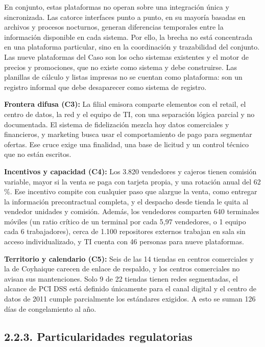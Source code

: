 \documentclass[11pt]{article}
\begin{document}
En conjunto, estas plataformas no operan sobre una integración única y sincronizada. Las catorce interfaces punto a punto, en su mayoría basadas en archivos y procesos nocturnos, generan diferencias temporales entre la información disponible en cada sistema. Por ello, la brecha no está concentrada en una plataforma particular, sino en la coordinación y trazabilidad del conjunto. Las nueve plataformas del Caso son los ocho sistemas existentes y el motor de precios y promociones, que no existe como sistema y debe construirse. Las planillas de cálculo y listas impresas no se cuentan como plataforma: son un registro informal que debe desaparecer como sistema de registro.

\textbf{Frontera difusa (C3):} La filial emisora comparte elementos con el retail, el centro de datos, la red y el equipo de TI, con una separación lógica parcial y no documentada. El sistema de fidelización mezcla hoy datos comerciales y financieros, y marketing busca usar el comportamiento de pago para segmentar ofertas. Ese cruce exige una finalidad, una base de licitud y un control técnico que no están escritos.

\textbf{Incentivos y capacidad (C4):} Los 3.820 vendedores y cajeros tienen comisión variable, mayor si la venta se paga con tarjeta propia, y una rotación anual del 62 \%. Ese incentivo compite con cualquier paso que alargue la venta, como entregar la información precontractual completa, y el despacho desde tienda le quita al vendedor unidades y comisión. Además, los vendedores comparten 640 terminales móviles (un ratio crítico de un terminal por cada 5,97 vendedores, o 1 equipo cada 6 trabajadores), cerca de 1.100 repositores externos trabajan en sala sin acceso individualizado, y TI cuenta con 46 personas para nueve plataformas.

\textbf{Territorio y calendario (C5):} Seis de las 14 tiendas en centros comerciales y la de Coyhaique carecen de enlace de respaldo, y los centros comerciales no avisan sus mantenciones. Solo 9 de 22 tiendas tienen redes segmentadas, el alcance de PCI DSS está definido únicamente para el canal digital y el centro de datos de 2011 cumple parcialmente los estándares exigidos. A esto se suman 126 días de congelamiento al año.

\subsection{2.2.3. Particularidades regulatorias}\label{particularidades-regulatorias}
\end{document}
